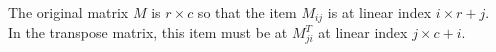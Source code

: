 \documentclass[aps,12pt]{revtex4}
\begin{document}
The original matrix $M$ is $r \times c$ so that the item $M_{ij}$ is at
linear index $i\times r + j$.\\
In the transpose matrix, this item must be at $M^T_{ji}$ at linear
index $j\times c + i$.
\end{document}
